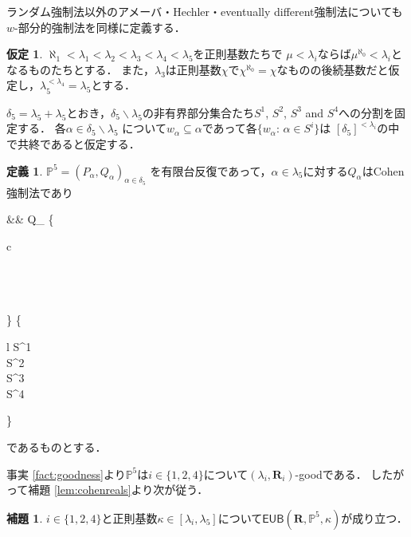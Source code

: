 \documentclass[uplatex,dvipdfmx]{jsarticle}
\newcommand{\EUB}{\mathsf{EUB}}
\newcommand{\relR}{\mathbf{R}}
\newcommand{\Pa}{\mathbb{P}^5}
\renewcommand{\setminus}{\smallsetminus}
\theoremstyle{definition}
\newtheorem{defi}[thm]{定義}
\newtheorem{lem}[thm]{補題}
\newtheorem{assumption}[thm]{仮定}
\begin{document}
	ランダム強制法以外のアメーバ・Hechler・eventually different強制法についても$w$-部分的強制法を同様に定義する．
	
	\begin{assumption}\label{asm:P}
		$\aleph_1<\lambda_1<\lambda_2<\lambda_3<\lambda_4<\lambda_5$を正則基数たちで
		$\mu<\lambda_i$ならば$\mu^{\aleph_0}<\lambda_i$となるものたちとする．
		また，$\lambda_3$は正則基数$\chi$で$\chi^{\aleph_0}=\chi$なものの後続基数だと仮定し，$\lambda_5^{<\lambda_4}=\lambda_5$とする．
		
		$\delta_5=\lambda_5+\lambda_5$とおき，$\delta_5\setminus\lambda_5$の非有界部分集合たち$S^1$, $S^2$, $S^3$ and $S^4$への分割を固定する．
		各$\alpha\in \delta_5\setminus\lambda_5$ について$w_\alpha\subseteq \alpha$であって各$\{w_\alpha:\, \alpha\in S^i\}$は $[\delta_5]^{{<}\lambda_i}$の中で共終であると仮定する．
	\end{assumption}
	
	\begin{defi}\label{def:Pa}
		$\Pa=(P_\alpha,Q_\alpha)_{\alpha\in\delta_5}$ 
		を有限台反復であって，$\alpha\in \lambda_5$に対する$Q_\alpha$はCohen強制法であり
		\begin{flalign*}
			&&
			Q_\alpha\text{ は$w_\alpha$-部分的 }
			\left\{
			\begin{array}{c}
				\\
				\\
				\\
				\\
			\end{array}\right\}
			 \hspace{0.5cm} \text{($\alpha$が}
			\left\{
			\begin{array}{l}
				S^1\\
				S^2\\
				S^3\\
				S^4\\
			\end{array}
			\right\} 
			\\
		\end{flalign*}
		であるものとする．
	\end{defi}

	事実 \ref{fact:goodness}より$\Pa$は$i\in\{1,2,4\}$について$(\lambda_i, \relR_i)$-goodである．
	したがって補題 \ref{lem:cohenreals}より次が従う．

	\begin{lem}
		$i \in \{1,2,4\}$と正則基数$\kappa \in [\lambda_i, \lambda_5]$について$\EUB(\relR, \Pa, \kappa)$が成り立つ．
	\end{lem}
\end{document}
